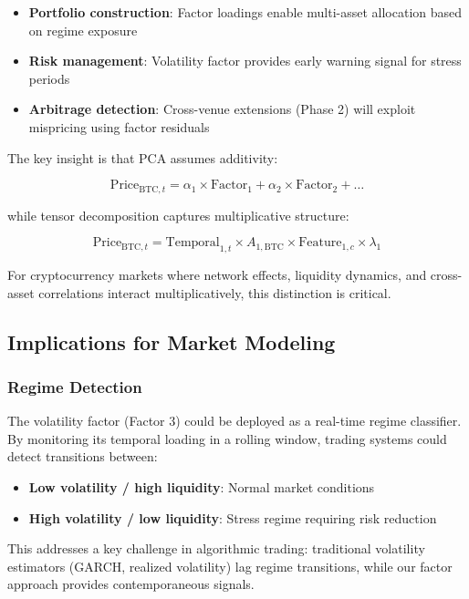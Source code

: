 \documentclass[11pt,twocolumn]{article}
\begin{document}
\begin{itemize}[leftmargin=*]
    \item \textbf{Portfolio construction}: Factor loadings enable multi-asset allocation based on regime exposure
    \item \textbf{Risk management}: Volatility factor provides early warning signal for stress periods
    \item \textbf{Arbitrage detection}: Cross-venue extensions (Phase 2) will exploit mispricing using factor residuals
\end{itemize}

The key insight is that PCA assumes additivity:

$$\mathrm{Price}_{\mathrm{BTC},t} = \alpha_1 \times \mathrm{Factor}_1 + \alpha_2 \times \mathrm{Factor}_2 + \ldots$$

while tensor decomposition captures multiplicative structure:

$$\mathrm{Price}_{\mathrm{BTC},t} = \mathrm{Temporal}_{1,t} \times A_{1,\mathrm{BTC}} \times \mathrm{Feature}_{1,c} \times \lambda_1$$

For cryptocurrency markets where network effects, liquidity dynamics, and cross-asset correlations interact multiplicatively, this distinction is critical.

\subsection{Implications for Market Modeling}

\subsubsection{Regime Detection}

The volatility factor (Factor 3) could be deployed as a real-time regime classifier. By monitoring its temporal loading in a rolling window, trading systems could detect transitions between:

\begin{itemize}[leftmargin=*]
    \item \textbf{Low volatility / high liquidity}: Normal market conditions
    \item \textbf{High volatility / low liquidity}: Stress regime requiring risk reduction
\end{itemize}

This addresses a key challenge in algorithmic trading: traditional volatility estimators (GARCH, realized volatility) lag regime transitions, while our factor approach provides contemporaneous signals.
\end{document}
